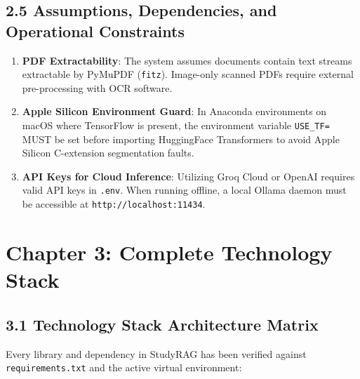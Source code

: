 \documentclass[
]{article}
\providecommand{\tightlist}{%
  \setlength{\itemsep}{0pt}\setlength{\parskip}{0pt}}
\begin{document}
\endgroup

\subsection{2.5 Assumptions, Dependencies, and Operational
Constraints}\label{assumptions-dependencies-and-operational-constraints}

\begin{enumerate}
\def\labelenumi{\arabic{enumi}.}
\tightlist
\item
  \textbf{PDF Extractability}: The system assumes documents contain text
  streams extractable by PyMuPDF (\texttt{fitz}). Image-only scanned
  PDFs require external pre-processing with OCR software.
\item
  \textbf{Apple Silicon Environment Guard}: In Anaconda environments on
  macOS where TensorFlow is present, the environment variable
  \texttt{USE\_\allowbreak TF=} MUST be set before importing HuggingFace
  Transformers to avoid Apple Silicon C-extension segmentation faults.
\item
  \textbf{API Keys for Cloud Inference}: Utilizing Groq Cloud or OpenAI
  requires valid API keys in \texttt{.\allowbreak env}. When running offline, a
  local Ollama daemon must be accessible at
  \texttt{http:/\allowbreak /\allowbreak localhost:11434}.
\end{enumerate}

\section{Chapter 3: Complete Technology
Stack}\label{chapter-3-complete-technology-stack}

\subsection{3.1 Technology Stack Architecture
Matrix}\label{technology-stack-architecture-matrix}

Every library and dependency in StudyRAG has been verified against
\texttt{requirements.\allowbreak txt} and the active virtual environment:
\end{document}
